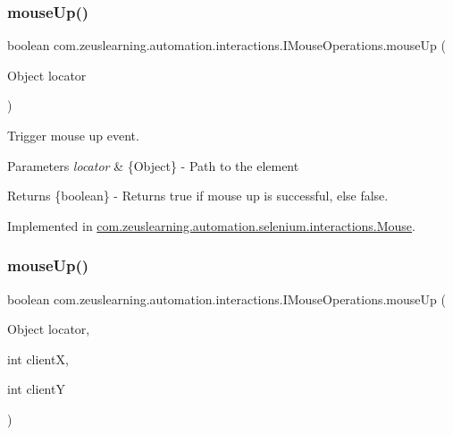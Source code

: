 \subsubsection{\texorpdfstring{mouse\+Up()}{mouseUp()}\hspace{0.1cm}{\footnotesize\ttfamily [1/2]}}
{\footnotesize\ttfamily boolean com.\+zeuslearning.\+automation.\+interactions.\+I\+Mouse\+Operations.\+mouse\+Up (\begin{DoxyParamCaption}\item[{Object}]{locator }\end{DoxyParamCaption})}

Trigger mouse up event.


\begin{DoxyParams}{Parameters}
{\em locator} & \{Object\} -\/ Path to the element \\
\hline
\end{DoxyParams}
\begin{DoxyReturn}{Returns}
\{boolean\} -\/ Returns {\ttfamily true} if mouse up is successful, else false. 
\end{DoxyReturn}


Implemented in \hyperlink{classcom_1_1zeuslearning_1_1automation_1_1selenium_1_1interactions_1_1Mouse_a0b7f2ca5dafa810dc0a0ec1669f40fef}{com.\+zeuslearning.\+automation.\+selenium.\+interactions.\+Mouse}.

\hypertarget{interfacecom_1_1zeuslearning_1_1automation_1_1interactions_1_1IMouseOperations_a4b357f6c590c2fb044ebbe1916396ac2}{}\label{interfacecom_1_1zeuslearning_1_1automation_1_1interactions_1_1IMouseOperations_a4b357f6c590c2fb044ebbe1916396ac2} 
\subsubsection{\texorpdfstring{mouse\+Up()}{mouseUp()}\hspace{0.1cm}{\footnotesize\ttfamily [2/2]}}
{\footnotesize\ttfamily boolean com.\+zeuslearning.\+automation.\+interactions.\+I\+Mouse\+Operations.\+mouse\+Up (\begin{DoxyParamCaption}\item[{Object}]{locator,  }\item[{int}]{clientX,  }\item[{int}]{clientY }\end{DoxyParamCaption})}

